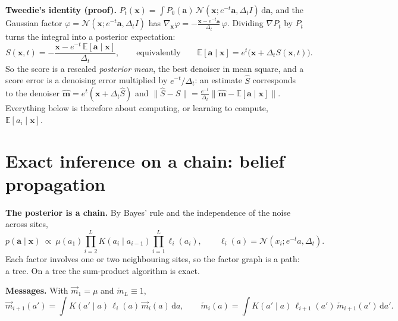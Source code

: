 \textbf{Tweedie's identity (proof).} $P_t(\mathbf x)=\int P_0(\mathbf a)\,\mathcal N(\mathbf x;e^{-t}\mathbf a,\Delta_tI)\,\mathrm d\mathbf a$, and the Gaussian factor
$\varphi=\mathcal N(\mathbf x;e^{-t}\mathbf a,\Delta_tI)$ has $\nabla_{\mathbf x}\varphi=-\frac{\mathbf x-e^{-t}\mathbf a}{\Delta_t}\,\varphi$. Dividing
$\nabla P_t$ by $P_t$ turns the integral into a posterior expectation:
\begin{equation}\label{eq:tweedie}
S(\mathbf x,t)=-\frac{\mathbf x-e^{-t}\,\mathbb E[\mathbf a\mid\mathbf x]}{\Delta_t},\qquad\text{equivalently}\qquad \mathbb E[\mathbf a\mid\mathbf x]=e^{t}\big(\mathbf x+\Delta_tS(\mathbf x,t)\big).
\end{equation}
So the score is a rescaled \emph{posterior mean}, the best denoiser in mean square, and a score error is a denoising error multiplied by $e^{-t}/\Delta_t$: an
estimate $\hat S$ corresponds to the denoiser $\hat{\mathbf m}=e^{t}(\mathbf x+\Delta_t\hat S)$ and $\|\hat S-S\|=\frac{e^{-t}}{\Delta_t}\|\hat{\mathbf m}-\mathbb E[\mathbf a\mid\mathbf x]\|$.
Everything below is therefore about computing, or learning to compute, $\mathbb E[a_i\mid\mathbf x]$.

\section{Exact inference on a chain: belief propagation}

\textbf{The posterior is a chain.} By Bayes' rule and the independence of the noise across sites,
\begin{equation}\label{eq:posterior}
p(\mathbf a\mid\mathbf x)\ \propto\ \mu(a_1)\prod_{i=2}^{L}K(a_i\mid a_{i-1})\prod_{i=1}^{L}\ell_i(a_i),\qquad \ell_i(a)=\mathcal N(x_i;e^{-t}a,\Delta_t).
\end{equation}
Each factor involves one or two neighbouring sites, so the factor graph is a path: a tree. On a tree the sum-product algorithm is exact.

\textbf{Messages.} With $\overrightarrow m_1=\mu$ and $\overleftarrow m_L\equiv1$,
\begin{equation}\label{eq:bp}
\overrightarrow m_{i+1}(a')=\int K(a'\mid a)\,\ell_i(a)\,\overrightarrow m_i(a)\,\mathrm da,\qquad
\overleftarrow m_{i}(a)=\int K(a'\mid a)\,\ell_{i+1}(a')\,\overleftarrow m_{i+1}(a')\,\mathrm da'.
\end{equation}

